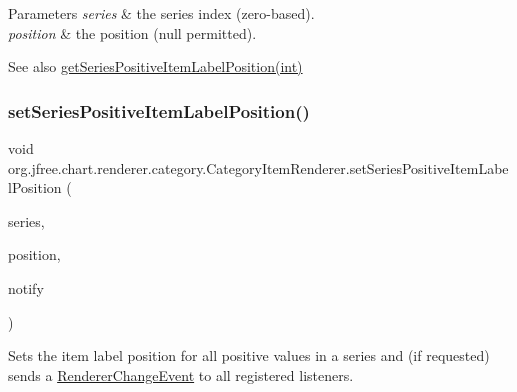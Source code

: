 \begin{DoxyParams}{Parameters}
{\em series} & the series index (zero-\/based). \\
\hline
{\em position} & the position ({\ttfamily null} permitted).\\
\hline
\end{DoxyParams}
\begin{DoxySeeAlso}{See also}
\mbox{\hyperlink{interfaceorg_1_1jfree_1_1chart_1_1renderer_1_1category_1_1_category_item_renderer_aa8bb0c1b20139707cb336afc9bed9b78}{get\+Series\+Positive\+Item\+Label\+Position(int)}} 
\end{DoxySeeAlso}
\mbox{\label{interfaceorg_1_1jfree_1_1chart_1_1renderer_1_1category_1_1_category_item_renderer_a6d26bf09dd9cf15bf416dbd2d897e8ba}} 
\subsubsection{\texorpdfstring{set\+Series\+Positive\+Item\+Label\+Position()}{setSeriesPositiveItemLabelPosition()}\hspace{0.1cm}{\footnotesize\ttfamily [2/2]}}
{\footnotesize\ttfamily void org.\+jfree.\+chart.\+renderer.\+category.\+Category\+Item\+Renderer.\+set\+Series\+Positive\+Item\+Label\+Position (\begin{DoxyParamCaption}\item[{int}]{series,  }\item[{\mbox{\hyperlink{classorg_1_1jfree_1_1chart_1_1labels_1_1_item_label_position}{Item\+Label\+Position}}}]{position,  }\item[{boolean}]{notify }\end{DoxyParamCaption})}

Sets the item label position for all positive values in a series and (if requested) sends a \mbox{\hyperlink{}{Renderer\+Change\+Event}} to all registered listeners.


